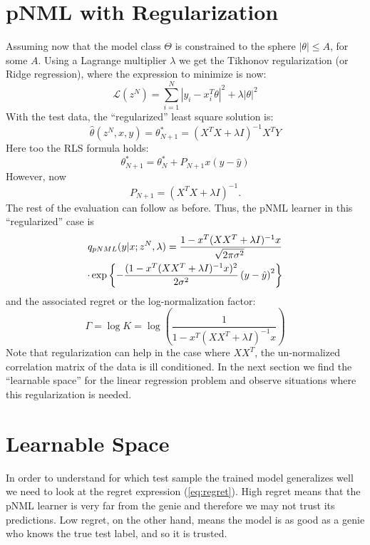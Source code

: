 \documentclass[conference,letterpaper]{IEEEtran}
\begin{document}
\section{pNML with Regularization} \label{sec:pNMLwithReg}
Assuming now that the model class $\Theta$ is constrained to the sphere  $|\theta|\leq A$, for some $A$. 
Using a Lagrange multiplier $\lambda$ we get the Tikhonov regularization (or Ridge regression), where the expression to minimize is now: 
\begin{equation}
\mathcal{L}(z^N)= \sum_{i=1}^{N}|y_i-x_i^T \theta|^2 + \lambda |\theta|^2
\end{equation}
With the test data, the ``regularized'' least square solution is:
\begin{equation}
\hat{\theta}(z^N,x,y) = \theta_{N+1}^* = (X^T X+ \lambda I)^{-1} X^T Y
\end{equation}
Here too the RLS formula holds: 
\begin{equation}
\theta_{N+1}^*=\theta^*_{N} + P_{N+1} x (y - \hat{y})
\end{equation}
However, now 
\begin{equation}
P_{N+1}= (X^T X+ \lambda I)^{-1}.    
\end{equation}
The rest of the evaluation can follow as before. 
Thus, the pNML learner in this ``regularized'' case is 
\begin{multline} \label{eq:pNML_least_sqaures}
q_{\mbox{\tiny{pNML}}}(y|x; z^N, \lambda)
=\frac{1 - x^T (XX^T + \lambda I)^{-1} x }{\sqrt[]{2\pi\sigma^2}} \\
\cdot \exp\left\{-\frac{(1 - x^T (XX^T + \lambda I)^{-1} x )^2 }{2\sigma^2}\left(y- \hat{y} \right)^2\right\} \\
\end{multline}
and the associated regret or the log-normalization factor:
\begin{equation}
\Gamma = \log K = \log \left( \frac{1}{1 - x^T (XX^T + \lambda I)^{-1} x } \right)
\end{equation}
Note that regularization can help in the case where $XX^T$, the un-normalized correlation matrix of the data is
ill conditioned. 
In the next section we find the ``learnable space'' for the linear regression problem and observe situations where this regularization is needed.

\section{Learnable Space} \label{sec:learnable_space}
In order to understand for which test sample the trained model generalizes well we need to look at the regret expression (\ref{eq:regret}). 
High regret means that the pNML learner is very far from the genie and therefore we may not trust its predictions. 
Low regret, on the other hand, means the model is as good as a genie who knows the true test label, and so it is trusted.
\end{document}
